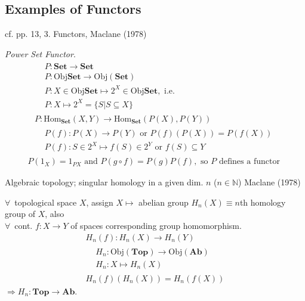 \documentclass[10pt]{amsart}
\begin{document}
\begin{multicols*}{2}
\subsection{Examples of Functors}

cf. pp. 13, 3. Functors, Maclane (1978) \cite{MacL1978}

\emph{Power Set Functor}. 
\[
\begin{gathered}
	\begin{aligned}
		& P : \textbf{Set} \to \textbf{Set} \\
		& P:\text{Obj}\textbf{Set} \to \text{Obj}(\textbf{Set}) \\
		& P: X \in \text{Obj}\textbf{Set} \mapsto 2^X \in \text{Obj}\textbf{Set}, \text{ i.e. } \\
		& P:X \mapsto 2^X = \lbrace S | S \subseteq X \rbrace 
	\end{aligned} \\
P : \text{Hom}_{\textbf{Set}}(X,Y) \to \text{Hom}_{\textbf{Set}}(P(X), P(Y)) \\
\begin{aligned} 
& P(f): P(X) \to P(Y) \text{ or } P(f)(P(X)) = P(f(X)) \\
& P(f): S \in 2^X \mapsto f(S) \in 2^Y \text{ or } f(S) \subseteq Y 
\end{aligned} 
\end{gathered}
\]
\[
\begin{gathered}
P(1_X) = 1_{PX} \text{ and } P(g\circ f) = P(g) P(f), \text{ so $P$ defines a functor }
\end{gathered}
\]

Algebraic topology; singular homology in a given dim. $n$ ($n \in \mathbb{N}$) Maclane (1978) \cite{MacL1978}

$\forall \, $ topological space $X$, assign $X \mapsto $ abelian group $H_n(X) \equiv n$th homology group of $X$, also \\
$\forall \, $ cont. $f:X \to Y$ of spaces corresponding group homomorphism. 
\[
\begin{gathered}
H_n(f) : H_n(X) \to H_n(Y) \\
\begin{aligned}
& H_n: \text{Obj}(\mathbf{Top}) \to \text{Obj}(\textbf{Ab}) \\
& H_n: X \mapsto H_n(X) 
\end{aligned} \\
H_n(f)(H_n(X)) = H_n(f(X))
\end{gathered}
\]
$\Longrightarrow H_n: \textbf{Top} \to \textbf{Ab}$.


\end{multicols*}
\end{document}

